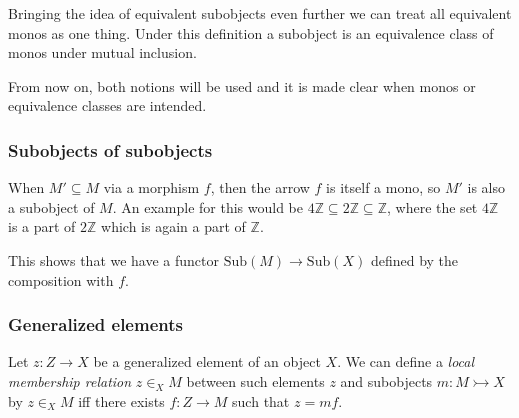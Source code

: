 \documentclass[11pt]{article}
\begin{document}
Bringing the idea of equivalent subobjects even further we can treat all
equivalent monos as one thing. Under this definition a subobject is an
equivalence class of monos under mutual inclusion.

From now on, both notions will be used and it is made clear when monos or
equivalence classes are intended.

\subsubsection{Subobjects of subobjects}

When $M' \subseteq M$ via a morphism $f$, then the arrow $f$ is itself a mono,
so $M'$ is also a subobject of $M$. An example for this would be $4\mathbb{Z}
\subseteq 2\mathbb{Z} \subseteq \mathbb{Z}$, where the set $4\mathbb{Z}$ is a
part of $2\mathbb{Z}$ which is again a part of $\mathbb{Z}$.

This shows that we have a functor $\text{Sub}(M) \rightarrow \text{Sub}(X)$
defined by the composition with $f$.

\subsubsection{Generalized elements}

Let $z: Z \rightarrow X$ be a generalized element of an object $X$. We can
define a \textit{local membership relation} $z \in_{X} M$ between such elements
$z$ and subobjects $m: M \rightarrowtail X$ by $z \in_{X} M$ iff there exists
$f: Z \rightarrow M$ such that $z = mf$.
\end{document}
